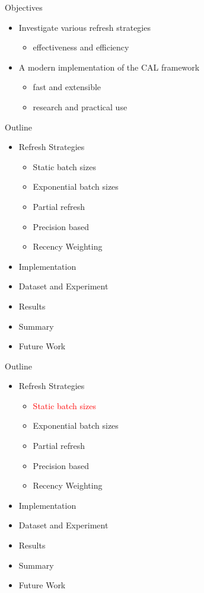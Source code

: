 \documentclass[14pt]{beamer}
\newcommand{\red}[1]{\textcolor{red}{#1}}
\begin{document}
\begin{frame}{Objectives}
\begin{itemize}
    \item Investigate various refresh strategies
        \begin{itemize}
            \item effectiveness and efficiency
        \end{itemize}
    \item A modern implementation of the CAL framework
        \begin{itemize}
            \item fast and extensible
            \item research and practical use
        \end{itemize}
\end{itemize}
\end{frame}

\begin{frame}{Outline}
\begin{itemize}
    \item Refresh Strategies
    \begin{itemize}
        \item Static batch sizes
        \item Exponential batch sizes
        \item Partial refresh
        \item Precision based
        \item Recency Weighting
    \end{itemize}
    \item Implementation
    \item Dataset and Experiment
    \item Results
    \item Summary
    \item Future Work
\end{itemize}
\end{frame}

\begin{frame}{Outline}
\begin{itemize}
    \item Refresh Strategies
    \begin{itemize}
        \item \red{Static batch sizes}
        \item Exponential batch sizes
        \item Partial refresh
        \item Precision based
        \item Recency Weighting
    \end{itemize}
    \item Implementation
    \item Dataset and Experiment
    \item Results
    \item Summary
    \item Future Work
\end{itemize}
\end{frame}
\end{document}
